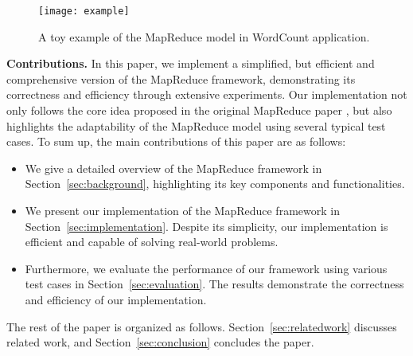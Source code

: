 \begin{figure*}
    \centering
    \texttt{[image: example]}
    \caption{A toy example of the MapReduce model in WordCount application.}
    \label{fig:example}
\end{figure*}

\noindent\textbf{Contributions.} In this paper, we implement a simplified, but efficient and comprehensive version of the MapReduce framework, demonstrating its correctness and efficiency through extensive experiments. Our implementation not only follows the core idea proposed in the original MapReduce paper \cite{dean2008mapreduce}, but also highlights the adaptability of the MapReduce model using several typical test cases. To sum up, the main contributions of this paper are as follows:

\begin{itemize}
    \item We give a detailed overview of the MapReduce framework in Section~\ref{sec:background}, highlighting its key components and functionalities.
    \item We present our implementation of the MapReduce framework in Section~\ref{sec:implementation}. Despite its simplicity, our implementation is efficient and capable of solving real-world problems.
    \item Furthermore, we evaluate the performance of our framework using various test cases in Section~\ref{sec:evaluation}. The results demonstrate the correctness and efficiency of our implementation.
\end{itemize}

The rest of the paper is organized as follows. Section~\ref{sec:relatedwork} discusses related work, and Section~\ref{sec:conclusion} concludes the paper.
